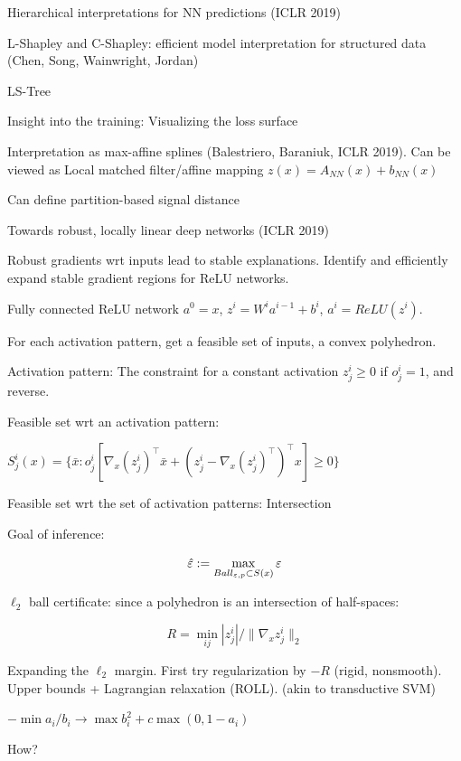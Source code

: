\documentclass[english]{article}
\begin{document}
\item Hierarchical interpretations for NN predictions (ICLR 2019)

\item L-Shapley and C-Shapley: efficient model interpretation for structured data (Chen, Song, Wainwright, Jordan)

LS-Tree


\item  Insight into the training: Visualizing the loss surface

\item Interpretation as max-affine splines (Balestriero, Baraniuk, ICLR 2019). Can be viewed as Local matched filter/affine mapping $z(x) = A_{NN}(x)+b_{NN}(x)$

Can define partition-based signal distance

\item Towards robust, locally linear deep networks (ICLR 2019)

Robust gradients wrt inputs lead to stable explanations. Identify and efficiently expand stable gradient regions for ReLU networks. 

Fully connected ReLU network $a^0=x$, $z^i = W^i a^{i-1}+b^i$, $a^i = ReLU(z^i)$.

For each activation pattern, get a feasible set of inputs, a convex polyhedron. 

Activation pattern: The constraint for a constant activation $z^i_j \ge 0$ if $o^i_j=1$, and reverse. 

Feasible set wrt an activation pattern: 

$S^i_j(x) = \{ \bar x: o^i_j 
[\nabla_x (z^i_j)^\top \bar x  
+ (z^i_j - \nabla_x (z^i_j)^\top)^\top x] \ge 0\}$

Feasible set wrt the set of activation patterns: Intersection 

Goal of inference:

$$\hat {\varepsilon} := \max_{Ball_{\varepsilon,p}\subset S(x)}\varepsilon$$

$\ell_2$ ball certificate: since a polyhedron is an intersection of half-spaces: 

$$R = \min_{ij} |z^i_j|/\|\nabla_x z^i_j\|_2$$

Expanding the $\ell_2$ margin. First try regularization by $-R$ (rigid, nonsmooth). Upper bounds + Lagrangian relaxation (ROLL). (akin to transductive SVM)

$-\min{a_i/b_i} \to \max b_i^2 + c\max(0,1-a_i)$

How? 
\end{document}
